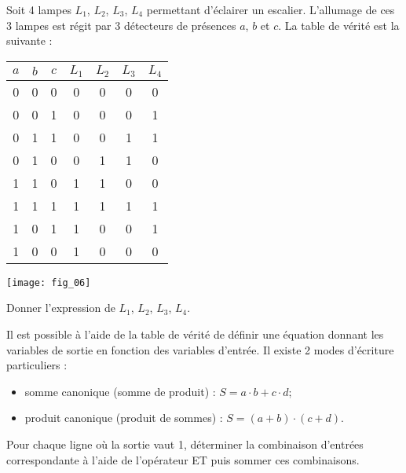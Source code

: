 \begin{exemple}
Soit 4 lampes $L_1$, $L_2$, $L_3$, $L_4$ permettant d'éclairer un escalier. L'allumage de ces 3 lampes est régit par 3 détecteurs de présences $a$, $b$ et $c$. La table de vérité est la suivante :

\begin{minipage}[c]{.4\linewidth}
\begin{center}
\begin{tabular}[c]{|c|c|c||c|c|c|c|}
\hline 
$a$ & $b$ & $c$ & $L_1$ & $L_2$ & $L_3$ & $L_4$ \\
\hline \hline
0 & 0 & 0 & 0 & 0 & 0 & 0 \\ \hline
0 & 0 & 1 & 0 & 0 & 0 & 1 \\ \hline
0 & 1 & 1 & 0 & 0 & 1 & 1 \\ \hline
0 & 1 & 0 & 0 & 1 & 1 & 0 \\ \hline
1 & 1 & 0 & 1 & 1 & 0 & 0 \\ \hline
1 & 1 & 1 & 1 & 1 & 1 & 1 \\ \hline
1 & 0 & 1 & 1 & 0 & 0 & 1 \\ \hline
1 & 0 & 0 & 1 & 0 & 0 & 0 \\ \hline 
\end{tabular}
\end{center}
\end{minipage}
\begin{minipage}[c]{.55\linewidth}
\begin{center}
\texttt{[image: fig\_06]}
\end{center}
\end{minipage}

Donner l'expression de $L_1$, $L_2$, $L_3$, $L_4$.
\end{exemple}

Il est possible à l'aide de la table de vérité de définir une équation donnant les variables de sortie en fonction des variables d'entrée. Il existe 2 modes d'écriture particuliers : 
\begin{itemize}
\item somme canonique (somme de produit) : $S=a\cdot b + c\cdot d$;
\item produit canonique (produit de sommes) : $S=(a+b) \cdot (c+d)$.
\end{itemize}

\begin{methode}

Pour chaque ligne où la sortie vaut 1, déterminer la combinaison d'entrées correspondante à l'aide de l'opérateur ET puis sommer ces combinaisons. 
\end{methode}


